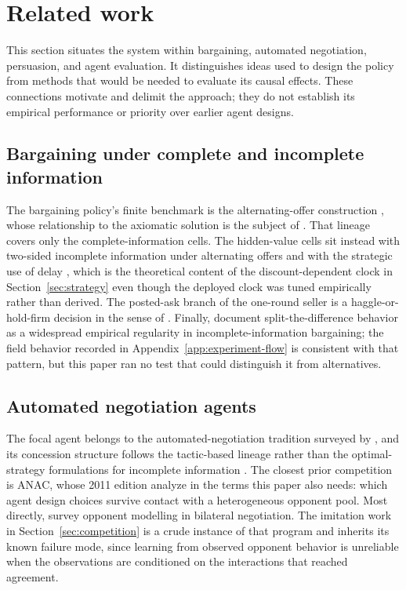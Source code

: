 \section{Related work}
\label{app:related-work}

This section situates the system within bargaining, automated negotiation,
persuasion, and agent evaluation. It distinguishes ideas used to design the
policy from methods that would be needed to evaluate its causal effects.
These connections motivate and delimit the approach; they do not establish
its empirical performance or priority over earlier agent designs.

\subsection{Bargaining under complete and incomplete information}

The bargaining policy's finite benchmark is the alternating-offer construction
\citep{rubinstein1982}, whose relationship to the axiomatic solution
\citep{nash1950bargaining} is the subject of \citet{binmore1986nash}. That
lineage covers only the complete-information cells. The hidden-value cells sit
instead with two-sided incomplete information under alternating offers
\citep{chatterjee1987twosided} and with the strategic use of delay
\citep{admati1987delay}, which is the theoretical content of the
discount-dependent clock in Section~\ref{sec:strategy} even though the deployed
clock was tuned empirically rather than derived. The posted-ask branch of the
one-round seller is a haggle-or-hold-firm decision in the sense of
\citet{riley1983selling}. Finally, \citet{keniston2024splitting} document
split-the-difference behavior as a widespread empirical regularity in
incomplete-information bargaining; the field behavior recorded in
Appendix~\ref{app:experiment-flow} is consistent with that pattern, but this
paper ran no test that could distinguish it from alternatives.

\subsection{Automated negotiation agents}

The focal agent belongs to the automated-negotiation tradition surveyed by
\citet{jennings2001automated}, and its concession structure follows the
tactic-based lineage \citep{faratin1998negotiation} rather than the
optimal-strategy formulations for incomplete information
\citep{fatima2002optimal}. The closest prior competition is ANAC, whose 2011
edition \citet{baarslag2013anac} analyze in the terms this paper also needs:
which agent design choices survive contact with a heterogeneous opponent pool.
Most directly, \citet{baarslag2016opponent} survey opponent modelling in
bilateral negotiation. The imitation work in Section~\ref{sec:competition} is a
crude instance of that program and inherits its known failure mode, since
learning from observed opponent behavior is unreliable when the observations
are conditioned on the interactions that reached agreement.


